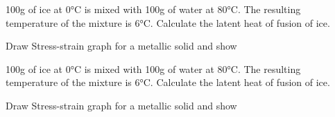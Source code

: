 \documentclass[10pt, a4paper, twoside]{exam}
\begin{document}
\begin{multicols*}{2}
\begin{questions}
        \question 100g of ice at 0°C is mixed with 100g of water at 80°C. The resulting temperature of the mixture is 6°C. Calculate the latent heat of fusion of ice.
        
        \question Draw Stress-strain graph for a metallic solid and show
    
    
        \question 100g of ice at 0°C is mixed with 100g of water at 80°C. The resulting temperature of the mixture is 6°C. Calculate the latent heat of fusion of ice.
        
        \question Draw Stress-strain graph for a metallic solid and show
    
    

\end{questions}
\end{multicols*}
\end{document}
